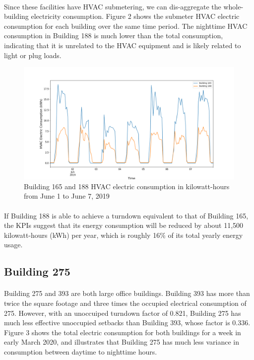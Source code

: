 \documentclass[a4paper]{article}
\begin{document}
\paragraph{}
Since these facilities have HVAC submetering, we can dis-aggregate the whole-building electricity consumption. Figure 2 shows the submeter HVAC electric consumption for each building over the same time period. The nighttime HVAC consumption in Building 188 is much lower than the total consumption, indicating that it is unrelated to the HVAC equipment and is likely related to light or plug loads.

\begin{figure}[H]
\centering
\includegraphics[width=.9\columnwidth]{./images/188v165_Turndown_HVAC.png}
\caption{Building 165 and 188 HVAC electric consumption in kilowatt-hours from June 1 to June 7, 2019}
\end{figure}

\paragraph{}
If Building 188 is able to achieve a turndown equivalent to that of Building 165, the KPIs suggest that its energy consumption will be reduced by about 11,500 kilowatt-hours (kWh) per year, which is roughly 16\% of its total yearly energy usage.

\subsection{Building 275}

\paragraph{}
Building 275 and 393 are both large office buildings. Building 393 has more than twice the square footage and three times the occupied electrical consumption of 275. However, with an unoccuiped turndown factor of 0.821, Building 275 has much less effective unoccupied setbacks than Building 393, whose factor is 0.336. Figure 3 shows the total electric consumption for both buildings for a week in early March 2020, and illustrates that Building 275 has much less variance in consumption between daytime to nighttime hours.
\end{document}
